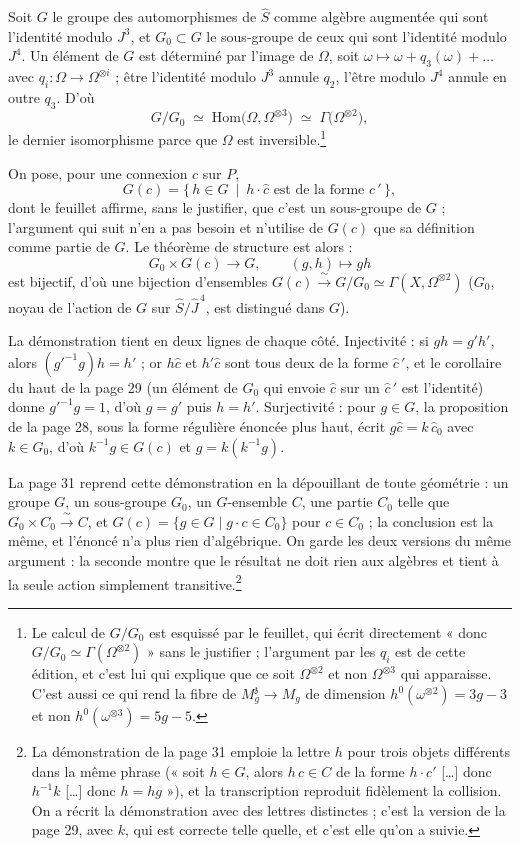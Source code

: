 \documentclass[11pt,a4paper]{article}
\begin{document}
Soit $G$ le groupe des automorphismes de $\widehat{S}$ comme algèbre
augmentée qui sont l'identité modulo $J^3$, et $G_0 \subset G$ le sous-groupe
de ceux qui sont l'identité modulo $J^4$. Un élément de $G$ est déterminé par
l'image de $\Omega$, soit $\omega \mapsto \omega + q_3(\omega) + \ldots$ avec
$q_i : \Omega \to \Omega^{\otimes i}$ ; être l'identité modulo $J^3$ annule
$q_2$, l'être modulo $J^4$ annule en outre $q_3$. D'où
\[
  G/G_0 \;\simeq\; \mathrm{Hom}\big(\Omega, \Omega^{\otimes 3}\big)
  \;\simeq\; \Gamma\big(\Omega^{\otimes 2}\big),
\]
le dernier isomorphisme parce que $\Omega$ est inversible.\footnote{Le calcul
de $G/G_0$ est esquissé par le feuillet, qui écrit directement
« donc $G/G_0 \simeq \Gamma(\Omega^{\otimes 2})$ » sans le justifier ;
l'argument par les $q_i$ est de cette édition, et c'est lui qui explique que
ce soit $\Omega^{\otimes 2}$ et non $\Omega^{\otimes 3}$ qui apparaisse. C'est
aussi ce qui rend la fibre de $M_g^{\mathfrak{z}} \to M_g$ de dimension
$h^0(\omega^{\otimes 2}) = 3g-3$ et non $h^0(\omega^{\otimes 3}) = 5g-5$.}

On pose, pour une connexion $c$ sur $P$,
\[
  G(c) = \{\, h \in G \ \mid\ h \cdot \widehat{c}
  \text{ est de la forme } \widehat{c}\,' \,\},
\]
dont le feuillet affirme, sans le justifier, que c'est un sous-groupe de
$G$ ; l'argument qui suit n'en a pas besoin et n'utilise de $G(c)$ que sa
définition comme partie de $G$. Le théorème de structure est alors :
\[
  G_0 \times G(c) \longrightarrow G, \qquad (g,h) \longmapsto g h
\]
est bijectif, d'où une bijection d'ensembles $G(c) \xrightarrow{\ \sim\ }
G/G_0 \simeq \Gamma(X, \Omega^{\otimes 2})$ ($G_0$, noyau de l'action de $G$
sur $\widehat{S}/\widehat{J}^{\,4}$, est distingué dans $G$).

La démonstration tient en deux lignes de chaque côté. Injectivité : si
$gh = g'h'$, alors $(g'^{-1}g)h = h'$ ; or $h\widehat{c}$ et $h'\widehat{c}$
sont tous deux de la forme $\widehat{c}\,'$, et le corollaire du haut de la
page 29 (un élément de $G_0$ qui envoie $\widehat{c}$ sur un $\widehat{c}\,'$
est l'identité) donne $g'^{-1}g = 1$, d'où $g = g'$ puis $h = h'$.
Surjectivité : pour $g \in G$, la proposition de la page 28, sous la forme
régulière énoncée plus haut, écrit $g\widehat{c} = k\,\widehat{c}_0$ avec
$k \in G_0$, d'où $k^{-1}g \in G(c)$ et
$g = k(k^{-1}g)$.

La page 31 reprend cette démonstration en la dépouillant de toute
géométrie : un groupe $G$, un sous-groupe $G_0$, un $G$-ensemble $C$, une
partie $C_0$ telle que $G_0 \times C_0 \xrightarrow{\ \sim\ } C$, et
$G(c) = \{g \in G \mid g\cdot c \in C_0\}$ pour $c \in C_0$ ; la conclusion est
la même, et l'énoncé n'a plus rien d'algébrique. On garde les deux
versions du même argument : la seconde montre
que le résultat ne doit rien aux algèbres et tient à la seule action
simplement transitive.\footnote{La démonstration de la page 31 emploie la
lettre $h$ pour trois objets différents dans la même phrase (« soit
$h \in G$, alors $h\,c \in C$ de la forme $h \cdot c'$ [\ldots] donc $h^{-1}k$
[\ldots] donc $h = hg$ »), et la transcription reproduit fidèlement la
collision. On a récrit la démonstration avec des lettres distinctes ; c'est la
version de la page 29, avec $k$, qui est correcte telle quelle, et c'est elle
qu'on a suivie.}
\end{document}
